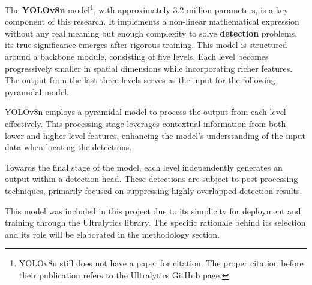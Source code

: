 
{
    The \textbf{\ac{YOLOv8n}} model\footnote{\ac{YOLOv8n} still does not have a paper for citation. The proper citation before their publication refers to the Ultralytics GitHub page\cite{Jocher_YOLO_by_Ultralytics_2023}.}, with approximately 3.2 million parameters, is a key component of this research. 
    It implements a non-linear mathematical expression without any real meaning but enough complexity to solve \textbf{detection} problems, its true significance emerges after rigorous training. 
    This model is structured around a backbone module, consisting of five levels. 
    Each level becomes progressively smaller in spatial dimensions while incorporating richer features. 
    The output from the last three levels serves as the input for the following pyramidal model.
}

{
    YOLOv8n employs a pyramidal model to process the output from each level effectively. 
    This processing stage leverages contextual information from both lower and higher-level features, enhancing the model's understanding of the input data when locating the detections.
}

{
    Towards the final stage of the model, each level independently generates an output within a detection head. 
    These detections are subject to post-processing techniques, primarily focused on suppressing highly overlapped detection results.
}


{
    This model was included in this project due to its simplicity for deployment and training through the Ultralytics library\cite{Jocher_YOLO_by_Ultralytics_2023}. 
    The specific rationale behind its selection and its role will be elaborated in the methodology section.
}

